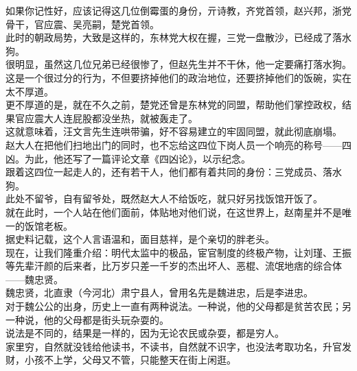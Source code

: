 \begin{multicols}{\theparacolNo}
如果你记性好，应该记得这几位倒霉蛋的身份，亓诗教，齐党首领，赵兴邦，浙党骨干，官应震、吴亮嗣，楚党首领。\\

此时的朝政局势，大致是这样的，东林党大权在握，三党一盘散沙，已经成了落水狗。\\

很明显，虽然这几位兄弟已经很惨了，但赵先生并不干休，他一定要痛打落水狗。\\

这是一个很过分的行为，不但要挤掉他们的政治地位，还要挤掉他们的饭碗，实在太不厚道。\\

更不厚道的是，就在不久之前，楚党还曾是东林党的同盟，帮助他们掌控政权，结果官应震大人连屁股都没坐热，就被轰走了。\\

这就意味着，汪文言先生连哄带骗，好不容易建立的牢固同盟，就此彻底崩塌。\\

赵大人在把他们扫地出门的同时，也不忘给这四位下岗人员一个响亮的称号——四凶。为此，他还写了一篇评论文章《四凶论》，以示纪念。\\

跟着这四位一起走人的，还有若干人，他们都有着共同的身份：三党成员、落水狗。\\

此处不留爷，自有留爷处，既然赵大人不给饭吃，就只好另找饭馆开饭了。\\

就在此时，一个人站在他们面前，体贴地对他们说，在这世界上，赵南星并不是唯一的饭馆老板。\\

据史料记载，这个人言语温和，面目慈祥，是个亲切的胖老头。\\

现在，让我们隆重介绍：明代太监中的极品，宦官制度的终极产物，让刘瑾、王振等先辈汗颜的后来者，比万岁只差一千岁的杰出坏人、恶棍、流氓地痞的综合体——魏忠贤。\\

魏忠贤，北直隶（今河北）肃宁县人，曾用名先是魏进忠，后是李进忠。\\

对于魏公公的出身，历史上一直有两种说法。一种说，他的父母都是贫苦农民；另一种说，他的父母都是街头玩杂耍的。\\

说法是不同的，结果是一样的，因为无论农民或杂耍，都是穷人。\\

家里穷，自然就没钱给他读书，不读书，自然就不识字，也没法考取功名，升官发财，小孩不上学，父母又不管，只能整天在街上闲逛。\\


\end{multicols}
